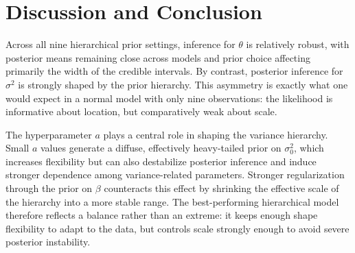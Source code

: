 \documentclass[11pt]{article}
\begin{document}
\section{Discussion and Conclusion}

Across all nine hierarchical prior settings, inference for $\theta$ is relatively robust, with posterior means remaining close across models and prior choice affecting primarily the width of the credible intervals. By contrast, posterior inference for $\sigma^2$ is strongly shaped by the prior hierarchy. This asymmetry is exactly what one would expect in a normal model with only nine observations: the likelihood is informative about location, but comparatively weak about scale.

The hyperparameter $a$ plays a central role in shaping the variance hierarchy. Small $a$ values generate a diffuse, effectively heavy-tailed prior on $\sigma_0^2$, which increases flexibility but can also destabilize posterior inference and induce stronger dependence among variance-related parameters. Stronger regularization through the prior on $\beta$ counteracts this effect by shrinking the effective scale of the hierarchy into a more stable range. The best-performing hierarchical model therefore reflects a balance rather than an extreme: it keeps enough shape flexibility to adapt to the data, but controls scale strongly enough to avoid severe posterior instability.
\end{document}
